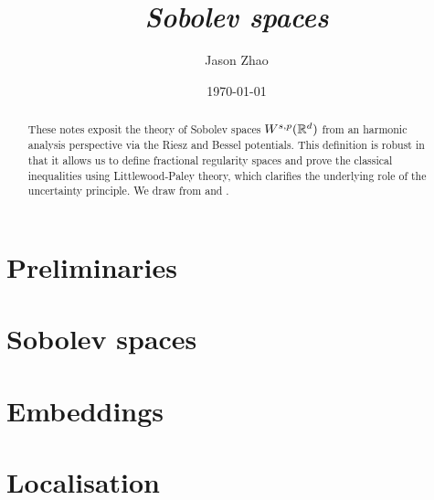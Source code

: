 \documentclass[reqno]{amsart}
\title
{
	\emph{Sobolev spaces}
}
\author{Jason Zhao}
\date{\today}
\begin{document}
\maketitle

\begin{abstract}
	These notes exposit the theory of Sobolev spaces $W^{s, p} (\mathbb R^d)$ from an harmonic analysis perspective via the Riesz and Bessel potentials. This definition is robust in that it allows us to define fractional regularity spaces and prove the classical inequalities using Littlewood-Paley theory, which clarifies the underlying role of the uncertainty principle. We draw from \cite[Chapter III]{Stein16} and \cite[Appendix A]{Tao2006}.
\end{abstract}

\tableofcontents

\section{Preliminaries}


\section{Sobolev spaces}


\section{Embeddings}


\section{Localisation}




\end{document}
